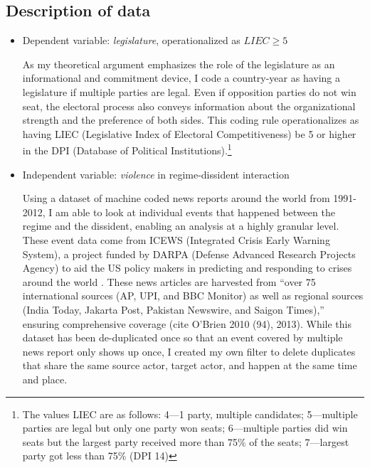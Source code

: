 \subsection{Description of data}

\begin{itemize}

\item Dependent variable: \textit{legislature}, operationalized as $LIEC \geq 5$ 

As my theoretical argument emphasizes the role of the legislature as an informational and commitment device, I code a country-year as having a legislature if multiple parties are legal. Even if opposition parties do not win seat, the electoral process also conveys information about the organizational strength and the preference of both sides. This coding rule operationalizes as having LIEC (Legislative Index of Electoral Competitiveness) be 5 or higher in the DPI (Database of Political Institutions).\footnote{The values LIEC are as follows: 4---1 party, multiple candidates; 5---multiple parties are legal but only one party won seats; 6---multiple parties did win seats but the largest party received more than 75\% of the seats; 7---largest party got less than 75\% (DPI 14)}

\item Independent variable: \textit{violence} in regime-dissident interaction

Using a dataset of machine coded news reports around the world from 1991-2012, I am able to look at individual events that happened between the regime and the dissident, enabling an analysis at a highly granular level. These event data come from ICEWS (Integrated Crisis Early Warning System), a project funded by DARPA (Defense Advanced Research Projects Agency) to aid the US policy makers in predicting and responding to crises around the world . These news articles are harvested from ``over 75 international sources (AP, UPI, and BBC Monitor) as well as regional sources (India Today, Jakarta Post, Pakistan Newswire, and Saigon Times),'' ensuring comprehensive coverage  (cite O'Brien 2010 (94), 2013). While this dataset has been de-duplicated once so that an event covered by multiple news report only shows up once, I created my own filter to delete duplicates that share the same source actor, target actor, and happen at the same time and place.


\end{itemize}
